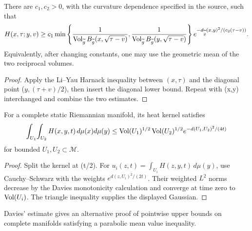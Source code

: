 \begin{theorem}
\label{thm:chow-iii-evolving-heat-kernel-gaussian-lower-bound}
There are \(c_1,c_2>0\), with the curvature dependence specified in the
source, such that
\[
 H(x,\tau;y,v)\ge c_1
 \min\left\{
 \frac1{\operatorname{Vol}_{\widetilde g}B_{\widetilde g}(x,\sqrt{\tau-v})},
 \frac1{\operatorname{Vol}_{\widetilde g}B_{\widetilde g}(y,\sqrt{\tau-v})}
 \right\}
 e^{-d_{\widetilde g}(x,y)^2/(c_2(\tau-v))}.
\]
Equivalently, after changing constants, one may use the geometric mean of
the two reciprocal volumes.
\end{theorem}
\begin{proof}
Apply the Li--Yau Harnack inequality between \((x,\tau)\) and the diagonal
point (\(y,(\tau+v)/2\)), then insert the diagonal lower bound.  Repeat with
(x,y) interchanged and combine the two estimates.
\end{proof}

\begin{theorem}
\label{thm:chow-iii-davies-double-integral-upper-bound}
For a complete static Riemannian manifold, its heat kernel satisfies
\[
 \int_{U_1}\!\int_{U_2}H(x,y,t)\,d\mu(x)d\mu(y)
 \le \operatorname{Vol}(U_1)^{1/2}\operatorname{Vol}(U_2)^{1/2}
 e^{-d(U_1,U_2)^2/(4t)}
\]
for bounded \(U_1,U_2\subset\mathcal M\).
\end{theorem}
\begin{proof}
Split the kernel at (t/2).  For
\(u_i(z,t)=\int_{U_i}H(z,y,t)\,d\mu(y)\), use Cauchy--Schwarz with the
weights \(e^{d(z,U_i)^2/(2t)}\).  Their weighted \(L^2\) norms decrease by
the Davies monotonicity calculation and converge at time zero to
\(\operatorname{Vol}(U_i)\).  The triangle inequality supplies the displayed Gaussian.
\end{proof}

\begin{remark}
\label{rem:chow-iii-davies-estimate-pointwise-use}
Davies' estimate gives an alternative proof of pointwise upper bounds on
complete manifolds satisfying a parabolic mean value inequality.
\end{remark}

